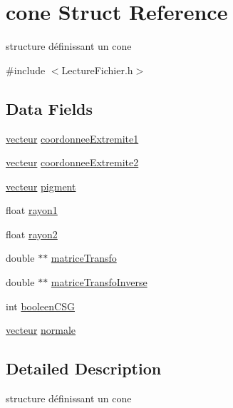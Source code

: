 \hypertarget{structcone}{
\section{cone Struct Reference}
\label{structcone}
}


structure définissant un cone  




{\ttfamily \#include $<$LectureFichier.h$>$}

\subsection*{Data Fields}
\begin{DoxyCompactItemize}
\item 
\hyperlink{structvecteur}{vecteur} \hyperlink{structcone_afb2be5d3ea17eb45de040c4ab9f15a38}{coordonneeExtremite1}
\item 
\hyperlink{structvecteur}{vecteur} \hyperlink{structcone_aa1d3b217682ad932e6211bfb18ebb259}{coordonneeExtremite2}
\item 
\hyperlink{structvecteur}{vecteur} \hyperlink{structcone_a5a4ee24431a1811fa1c8b75844198987}{pigment}
\item 
float \hyperlink{structcone_a1b8e70708fd2b25f83f0aacadbe0ddbd}{rayon1}
\item 
float \hyperlink{structcone_a8630bec8bf19ad824e1527744e48178e}{rayon2}
\item 
double $\ast$$\ast$ \hyperlink{structcone_aa06ccc348007e3355beccf412f2f656c}{matriceTransfo}
\item 
double $\ast$$\ast$ \hyperlink{structcone_acd7a3590501dcccfaefccbb658f83821}{matriceTransfoInverse}
\item 
int \hyperlink{structcone_a4428e32d4383f7dee25e5a4cb192da24}{booleenCSG}
\item 
\hyperlink{structvecteur}{vecteur} \hyperlink{structcone_a944738f40a0294270a0047acc5a77ee2}{normale}
\end{DoxyCompactItemize}


\subsection{Detailed Description}
structure définissant un cone 

